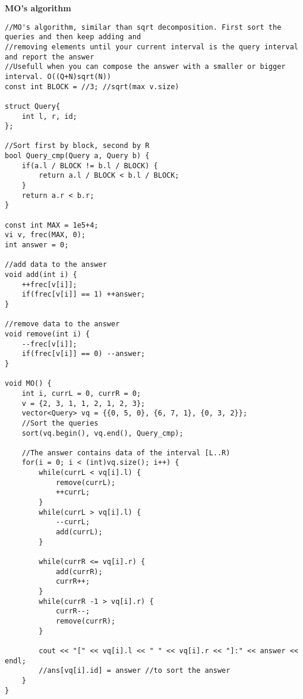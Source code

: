 \documentclass[a4paper,10pt]{article}
\newcommand{\titleAlg}[1]{\vspace{-10pt}
\begin{center}\textbf{#1}\end{center} \vspace{-10pt}}
\begin{document}
\titleAlg{MO's algorithm}
\begin{multicols}{2}
\begin{verbatim}
//MO's algorithm, similar than sqrt decomposition. First sort the queries and then keep adding and
//removing elements until your current interval is the query interval and report the answer
//Usefull when you can compose the answer with a smaller or bigger interval. O((Q+N)sqrt(N))
const int BLOCK = //3; //sqrt(max v.size)

struct Query{
    int l, r, id;
};

//Sort first by block, second by R
bool Query_cmp(Query a, Query b) {
    if(a.l / BLOCK != b.l / BLOCK) {
        return a.l / BLOCK < b.l / BLOCK;
    }
    return a.r < b.r;
}

const int MAX = 1e5+4;
vi v, frec(MAX, 0);
int answer = 0;

//add data to the answer
void add(int i) {
    ++frec[v[i]];
    if(frec[v[i]] == 1) ++answer;
}

//remove data to the answer
void remove(int i) {
    --frec[v[i]];
    if(frec[v[i]] == 0) --answer;
}

void MO() {
    int i, currL = 0, currR = 0;
    v = {2, 3, 1, 1, 2, 1, 2, 3};
    vector<Query> vq = {{0, 5, 0}, {6, 7, 1}, {0, 3, 2}};
    //Sort the queries
    sort(vq.begin(), vq.end(), Query_cmp);

    //The answer contains data of the interval [L..R)
    for(i = 0; i < (int)vq.size(); i++) {
        while(currL < vq[i].l) {
            remove(currL);
            ++currL;
        }
        while(currL > vq[i].l) {
            --currL;
            add(currL);
        }

        while(currR <= vq[i].r) {
            add(currR);
            currR++;
        }
        while(currR -1 > vq[i].r) {
            currR--;
            remove(currR);
        }

        cout << "[" << vq[i].l << " " << vq[i].r << "]:" << answer << endl;
        //ans[vq[i].id] = answer //to sort the answer
    }
}
\end{verbatim}
\end{multicols}
\end{document}
